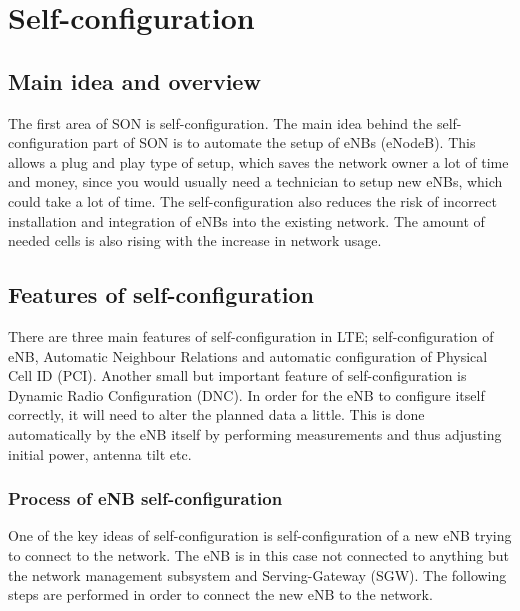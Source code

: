 \documentclass{report}
\begin{document}
\chapter{Self-configuration}
\section{Main idea and overview}
The first area of SON is self-configuration. The main idea behind the self-configuration part of SON is to automate the setup of eNBs (eNodeB). This allows a plug and play type of setup, which saves the network owner a lot of time and money, since you would usually need a technician to setup new eNBs, which could take a lot of time.  
The self-configuration also reduces the risk of incorrect installation and integration of eNBs into the existing network. The amount of needed cells is also rising with the increase in network usage.

\section{Features of self-configuration}
There are three main features of self-configuration in LTE; self-configuration of eNB, Automatic Neighbour Relations and automatic configuration of Physical Cell ID (PCI). 
Another small but important feature of self-configuration is Dynamic Radio Configuration (DNC). 
In order for the eNB to configure itself correctly, it will need to alter the planned data a little. This is done automatically by the eNB itself by performing measurements and thus adjusting initial power, antenna tilt etc. %

\subsection{Process of eNB self-configuration}

One of the key ideas of self-configuration is self-configuration of a new eNB trying to connect to the network. The eNB is in this case not connected to anything but the network management subsystem and Serving-Gateway (SGW). The following steps are performed in order to connect the new eNB to the network. 
\end{document}
